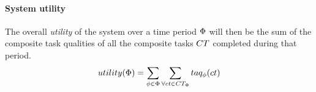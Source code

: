 \paragraph{System utility}
\label{section:utility}
The overall \textit{ utility} of the system over a time period $\Phi$ will then be the sum of the composite task qualities of all the composite tasks $\setCompositeTask{}{}$ completed during that period.
	\begin{equation}
		\label{eq:system_utility}
		\functionSystemUtility{}{} = \sum\limits_{\varTime{}{} \in \setTime{}{}}
		\sum\limits_{\forall \varCompositeTask{}{} \in \setCompositeTask{\setTime{}{}}{}}
		\functionCompositeTaskQuality{}{}
	\end{equation}

